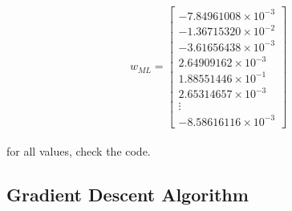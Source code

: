 \documentclass[12pt, a4paper]{article}
\begin{document}
\begin{itemize}
    \[
     w_{ML} = \begin{bmatrix}
     -7.84961008 \times 10^{-3} \\
     -1.36715320 \times 10^{-2} \\
     -3.61656438 \times 10^{-3} \\
     2.64909162 \times 10^{-3} \\
     1.88551446 \times 10^{-1} \\
     2.65314657 \times 10^{-3} \\
     \vdots \\
     -8.58616116 \times 10^{-3}
     \end{bmatrix}
    \]
    \\
    for all values, check the code.
\end{itemize}
\subsection{Gradient Descent Algorithm}
\end{document}
